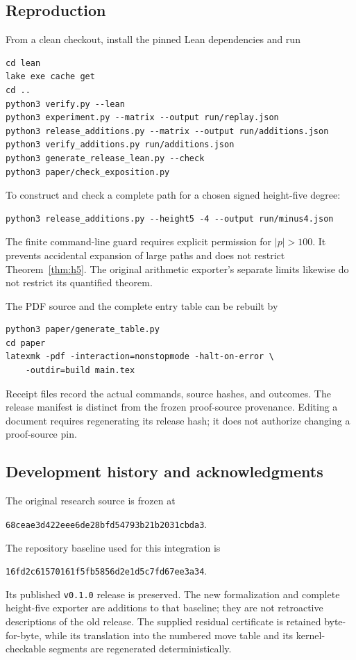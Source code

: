 \documentclass[11pt]{article}
\theoremstyle{definition}\newtheorem{definition}[theorem]{Definition}
\theoremstyle{remark}\newtheorem{remark}[theorem]{Remark}
\begin{document}
\subsection{Reproduction}
From a clean checkout, install the pinned Lean dependencies and run
\begin{verbatim}
cd lean
lake exe cache get
cd ..
python3 verify.py --lean
python3 experiment.py --matrix --output run/replay.json
python3 release_additions.py --matrix --output run/additions.json
python3 verify_additions.py run/additions.json
python3 generate_release_lean.py --check
python3 paper/check_exposition.py
\end{verbatim}
To construct and check a complete path for a chosen signed height-five degree:
\begin{verbatim}
python3 release_additions.py --height5 -4 --output run/minus4.json
\end{verbatim}
The finite command-line guard requires explicit permission for $|p|>100$. It prevents accidental expansion of large paths and does not restrict Theorem~\ref{thm:h5}. The original arithmetic exporter's separate limits likewise do not restrict its quantified theorem.

The PDF source and the complete entry table can be rebuilt by
\begin{verbatim}
python3 paper/generate_table.py
cd paper
latexmk -pdf -interaction=nonstopmode -halt-on-error \
    -outdir=build main.tex
\end{verbatim}
Receipt files record the actual commands, source hashes, and outcomes. The release manifest is distinct from the frozen proof-source provenance. Editing a document requires regenerating its release hash; it does not authorize changing a proof-source pin.

\subsection{Development history and acknowledgments}
The original research source is frozen at
\begin{center}\small\texttt{68ceae3d422eee6de28bfd54793b21b2031cbda3}.
\end{center}
The repository baseline used for this integration is
\begin{center}\small\texttt{16fd2c61570161f5fb5856d2e1d5c7fd67ee3a34}.
\end{center}
Its published \texttt{v0.1.0} release is preserved. The new formalization and complete height-five exporter are additions to that baseline; they are not retroactive descriptions of the old release. The supplied residual certificate is retained byte-for-byte, while its translation into the numbered move table and its kernel-checkable segments are regenerated deterministically.
\end{document}
